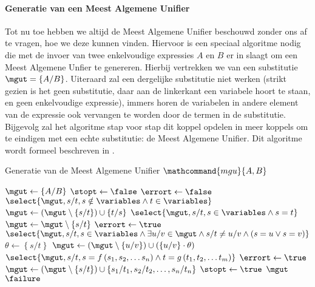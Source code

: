 \paragraph{Generatie van een Meest Algemene Unifier}
Tot nu toe hebben we altijd de Meest Algemene Unifier beschouwd zonder ons af te vragen, hoe we deze kunnen vinden. Hiervoor is een speciaal algoritme nodig die met de invoer van twee enkelvoudige expressies $A$ en $B$ er in slaagt om een Meest Algemene Unfier te genereren. Hierbij vertrekken we van een substitutie $\mgut=\left\{A/B\right\}$. Uiteraard zal een dergelijke substitutie niet werken (strikt gezien is het geen substitutie, daar aan de linkerkant een variabele hoort te staan, en geen enkelvoudige expressie), immers horen de variabelen in andere element van de expressie ook vervangen te worden door de termen in de substitutie. Bijgevolg zal het algoritme stap voor stap dit koppel opdelen in meer koppels om te eindigen met een echte substitutie: de Meest Algemene Unifier. Dit algoritme wordt formeel beschreven in .
\begin{algorithm}[htb]
\caption{Generatie van de Meest Algemene Unifier $\mathcommand{mgu}{A,B}$}
\label{alg:genesisMgu}
\begin{algorithmic}[1]
\STATE $\mgut\leftarrow\left\{A/B\right\}$
\STATE $\stopt\leftarrow\false$
\STATE $\errort\leftarrow\false$
\WHILE{$\neg\stopt\wedge\neg\errort$}
\STATE $\select{\mgut,s/t,s\notin\variables\wedge t\in\variables}$
\STATE $\mgut\leftarrow\left(\mgut\setminus\left\{s/t\right\}\right)\cup\left\{t/s\right\}$
\STATE $\select{\mgut,s/t,s\in\variables\wedge s=t}$
\STATE $\mgut\leftarrow\mgut\setminus\left\{s/t\right\}$
\STATE $\errort\leftarrow\true$
\STATE $\select{\mgut,s/t,s\in\variables\wedge\exists u/v\in\mgut\wedge s/t\neq u/v\wedge \left(s=u\vee s=v\right)}$
\STATE $\theta\leftarrow\left\{s/t\right\}$
\STATE $\mgut\leftarrow\left(\mgut\setminus\left\{u/v\right\}\right)\cup\left(\left\{u/v\right\}\cdot\theta\right)$
\ENDIF
\ENDFOR
{}
\STATE $\select{\mgut,s/t,s=f\left(s_1,s_2,\ldots s_n\right)\wedge t=g\left(t_1,t_2,\ldots t_m\right)}$
\STATE $\errort\leftarrow\true$
\ELSE
\STATE $\mgut\leftarrow\left(\mgut\setminus\left\{s/t\right\}\right)\cup\left\{s_1/t_1,s_2/t_2,\ldots,s_n/t_n\right\}$
\ENDIF
\ELSE
\STATE $\stopt\leftarrow\true$
\ENDIF
\ENDWHILE
\IF{$\neg\errort$}
\RETURN $\mgut$
\ELSE
\RETURN $\failure$
\ENDIF
\end{algorithmic}
\end{algorithm}
